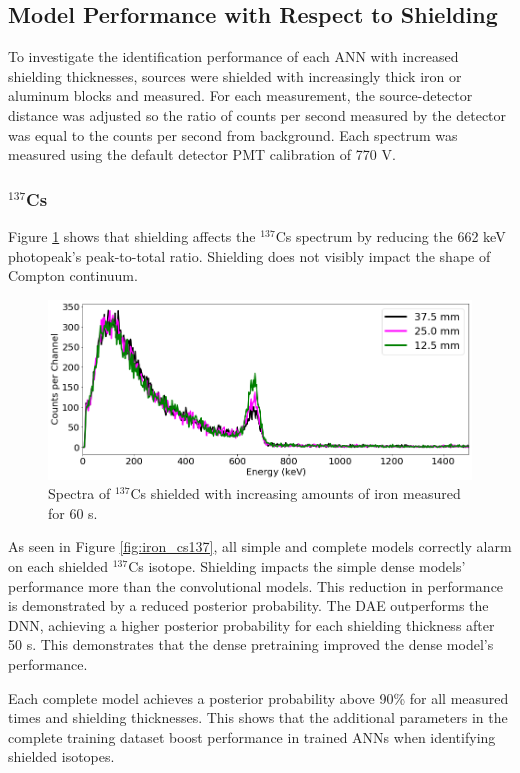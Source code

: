 \subsection{Model Performance with Respect to Shielding} \label{real_shielding_performance}

To investigate the identification performance of each ANN with increased shielding thicknesses, sources were shielded with increasingly thick iron or aluminum blocks and measured. For each measurement, the source-detector distance was adjusted so the ratio of counts per second measured by the detector was equal to the counts per second from background. Each spectrum was measured using the default detector PMT calibration of 770 V. 

\subsubsection{$^{137}$Cs}


Figure \ref{fig:shielded_cs137} shows that shielding affects the $^{137}$Cs spectrum by reducing the 662 keV photopeak's peak-to-total ratio. Shielding does not visibly impact the shape of Compton continuum. 

\begin{figure}[H]
	\centering
	\includegraphics[width=0.8\linewidth]{images/shielded_cs137}
	\caption{Spectra of $^{137}$Cs shielded with increasing amounts of iron measured for 60 s.}
	\label{fig:shielded_cs137}
\end{figure}

As seen in Figure \ref{fig:iron_cs137}, all simple and complete models correctly alarm on each shielded $^{137}$Cs isotope. Shielding impacts the simple dense models' performance more than the convolutional models. This reduction in performance is demonstrated by a reduced posterior probability. The DAE outperforms the DNN, achieving a higher posterior probability for each shielding thickness after 50 s. This demonstrates that the dense pretraining improved the dense model's performance.

Each complete model achieves a posterior probability above 90\% for all measured times and shielding thicknesses. This shows that the additional parameters in the complete training dataset boost performance in trained ANNs when identifying shielded isotopes.

